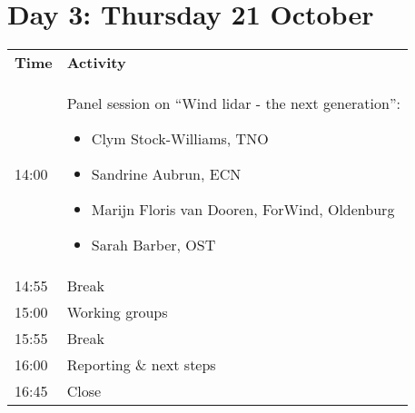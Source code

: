 \section{Day 3: Thursday 21 October}

\begin{table}[!h]
    \centering
    \begin{tabular}{@{}|p{}|p{}|@{}}
    \rowcolor{Task32Blue2} \textbf{Time} & \textbf{Activity} \\  
    14:00 & Panel session on “Wind lidar - the next generation”:
        \begin{itemize}
            \item Clym Stock-Williams, TNO
            \item Sandrine Aubrun, ECN
            \item Marijn Floris van Dooren, ForWind, Oldenburg
            \item Sarah Barber, OST
        \end{itemize} \\
    14:55 & Break \\
    15:00 & Working groups \\
    15:55 & Break \\
    16:00 & Reporting \& next steps \\
    16:45 & Close
    \end{tabular}
    \label{tab:day2-agenda}
\end{table}
